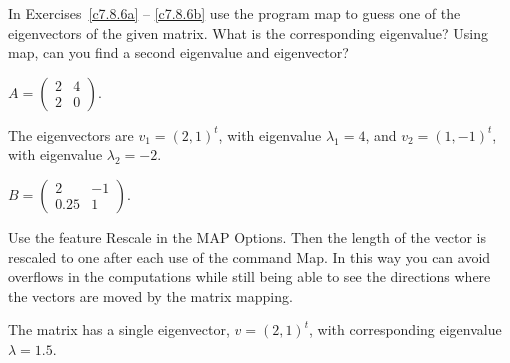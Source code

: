 \documentclass{ximera}
\begin{document}
\noindent In Exercises~\ref{c7.8.6a} -- \ref{c7.8.6b} use the program
{\sf map} to guess one of the eigenvectors of the given matrix.  What is
the corresponding eigenvalue?  Using {\sf map}, can you find a second
eigenvalue and eigenvector?
\begin{computerExercise} \label{c7.8.6a}
$A=\left(\begin{array}{rr} 2 & 4\\ 2 & 0
\end{array}\right)$.

\begin{solution}
The eigenvectors are $v_1 = (2,1)^t$, with eigenvalue
$\lambda_1 = 4$, and $v_2 = (1,-1)^t$, with eigenvalue $\lambda_2 = -2$.

\end{solution}
\end{computerExercise}
\begin{computerExercise} \label{c7.8.6b}
$B=\left(\begin{array}{rr} 2 & -1\\ 0.25 & 1
\end{array}\right)$.

 Use the feature {\sf Rescale} in the
{\sf MAP Options}.  Then the length of the vector is rescaled to one
after each use of the command {\sf Map}. In this way you can avoid
overflows in the computations while still being able to see the
directions where the vectors are moved by the matrix mapping.

\begin{solution}
The matrix has a single eigenvector, $v = (2,1)^t$, with
corresponding eigenvalue $\lambda = 1.5$.

\end{solution}
\end{computerExercise}
\end{document}
